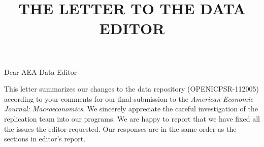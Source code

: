 \documentclass[twoside,12pt,leqno]{article}
\begin{document}
\title{\large{THE LETTER TO THE DATA EDITOR}}
\date{}
\maketitle

\vspace{-1.75cm}

\begin{flushleft}
Dear AEA Data Editor
\end{flushleft}

This letter summarizes our changes to the data repository (OPENICPSR-112005) according to your comments for our final submission to the \textit{American Economic Journal: Macroeconomics}. We sincerely appreciate the careful investigation of the replication team into our programs. We are happy to report that we have fixed all the issues the editor requested. Our responses are in the same order as the sections in editor's report.
\end{document}
